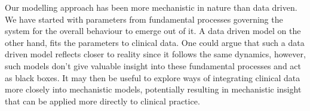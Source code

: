 Our modelling approach has been more mechanistic in nature than data driven. We have started with parameters from fundamental processes governing the system for the overall behaviour to emerge out of it. A data driven model on the other hand, fits the parameters to clinical data. One could argue that such a data driven model reflects closer to reality since it follows the same dynamics, however, such models don’t give valuable insight into these fundamental processes and act as black boxes. It may then be useful to explore ways of integrating clinical data more closely into mechanistic models, potentially resulting in mechanistic insight that can be applied more directly to clinical practice.
